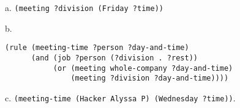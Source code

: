 \documentclass[a4paper,12pt]{article}
\newcommand{\subpar}[1]{\medskip \noindent #1.}
\begin{document}
\subpar{a} \lstinline!(meeting ?division (Friday ?time))!

\subpar{b}

\begin{lstlisting}
(rule (meeting-time ?person ?day-and-time)
      (and (job ?person (?division . ?rest))
           (or (meeting whole-company ?day-and-time)
               (meeting ?division ?day-and-time))))
\end{lstlisting}

\subpar{c} \lstinline!(meeting-time (Hacker Alyssa P) (Wednesday ?time))!.
\end{document}
